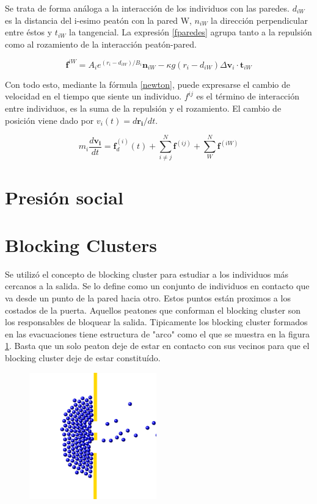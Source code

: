 Se trata de forma análoga a la interacción de los individuos con las paredes. $d_{iW}$ es la distancia del i-esimo peatón con la pared W, $n_{iW}$ la dirección perpendicular entre éstos y $t_{iW}$ la tangencial. La expresión \ref{fparedes} agrupa tanto a la repulsión como al rozamiento de la interacción peatón-pared.

\begin{equation}
\mathbf{f}^{iW}=A_ie^{(r_{i}-d_{iW})/B_i}\mathbf{n}_{iW}-\kappa g(r_{i}-d_{iW})\Delta \mathbf{v}_{i}\cdot\mathbf{t}_{iW}
\label{fparedes}
\end{equation} 

Con todo esto, mediante la fórmula \ref{newton}, puede expresarse el cambio de velocidad en el tiempo que siente un individuo. $f^{ij}$ es el término de interacción entre individuos, es la suma de la repulsión y el rozamiento. El cambio de posición viene dado por $v_{i}(t)=d\mathbf{r_i}/dt$.

\begin{equation}
m_i\frac{d\mathbf{v_i}}{dt}=\mathbf{f}_d^ {(i)}(t)+ \sum_{i\neq j}^{N}\mathbf{f}^{(ij)} + \sum_{W}^{N}\mathbf{f}^{(iW)}
\label{newton}
\end{equation}  
 
\section{Presión social}

\section{Blocking Clusters}

Se utilizó el concepto de blocking cluster para estudiar a los individuos más cercanos a la salida. Se lo define como un conjunto de individuos en contacto que va desde un punto de la pared hacia otro. Estos puntos están proximos a los costados de la puerta. Aquellos peatones que conforman el blocking cluster son los responsables de bloquear la salida.  Tipicamente los blocking cluster formados en las evacuaciones tiene estructura de "arco" como el que se muestra en la figura \ref{bc}. Basta que un solo peaton deje de estar en contacto con sus vecinos para que el blocking cluster deje de estar constituído. \\

\begin{figure}[H]
    \centering
    \includegraphics[height=5.5cm]{figuras/dos_puertas.png}
    \caption[width=5cm]{}
    \label{bc}
\end{figure}

